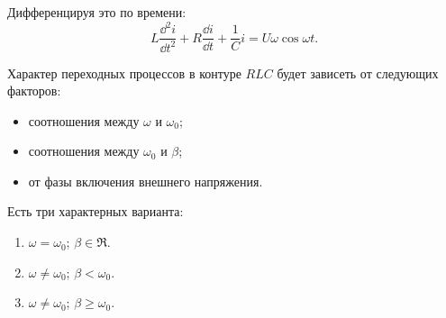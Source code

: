 	Дифференцируя это по времени:
	\[
        L\frac{\dd^2 i}{\dd t^2} + R\frac{\dd i}{\dd t} + \frac{1}{C}i =
        U\omega\cos\omega t.
    \]
	
	Характер переходных процессов в контуре \( RLC \) будет зависеть от
    следующих факторов:
	\begin{itemize}
        \item соотношения между \( \omega \) и \( \omega_0 \);
        \item соотношения между \( \omega_0 \) и \( \beta \);
        \item от фазы включения внешнего напряжения.
	\end{itemize}
	
	Есть три характерных варианта:
	\begin{enumerate}
        \item \( \omega = \omega_0 \); \( \beta \in \Re \).
        \item \( \omega \ne \omega_0 \); \( \beta < \omega_0 \).
        \item \( \omega \ne \omega_0 \); \( \beta \geq \omega_0 \).
	\end{enumerate}
